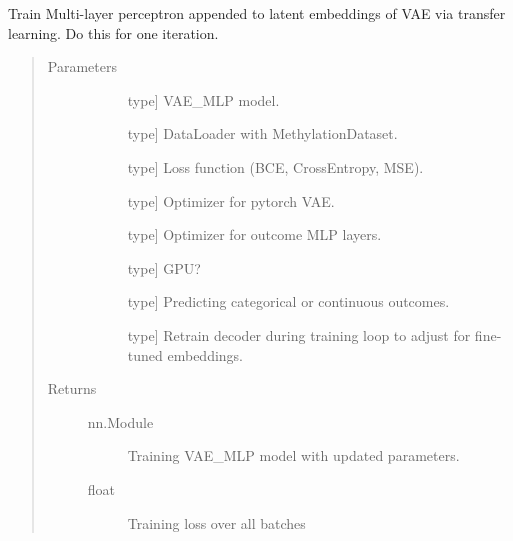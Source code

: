 \documentclass[letterpaper,10pt,english]{sphinxmanual}
\begin{document}
\begin{fulllineitems}
\label{\detokenize{index:methylnet.models.train_mlp}}
Train Multi-layer perceptron appended to latent embeddings of VAE via transfer learning. Do this for one iteration.
\begin{quote}\begin{description}
\item[{Parameters}] \leavevmode\begin{description}
\item[{}] \leavevmode{[}type{]}
VAE\_MLP model.

\item[{}] \leavevmode{[}type{]}
DataLoader with MethylationDataset.

\item[{}] \leavevmode{[}type{]}
Loss function (BCE, CrossEntropy, MSE).

\item[{}] \leavevmode{[}type{]}
Optimizer for pytorch VAE.

\item[{}] \leavevmode{[}type{]}
Optimizer for outcome MLP layers.

\item[{}] \leavevmode{[}type{]}
GPU?

\item[{}] \leavevmode{[}type{]}
Predicting categorical or continuous outcomes.

\item[{}] \leavevmode{[}type{]}
Retrain decoder during training loop to adjust for fine-tuned embeddings.

\end{description}

\item[{Returns}] \leavevmode\begin{description}
\item[{nn.Module}] \leavevmode
Training VAE\_MLP model with updated parameters.

\item[{float}] \leavevmode
Training loss over all batches

\end{description}

\end{description}\end{quote}

\end{fulllineitems}
\end{document}
